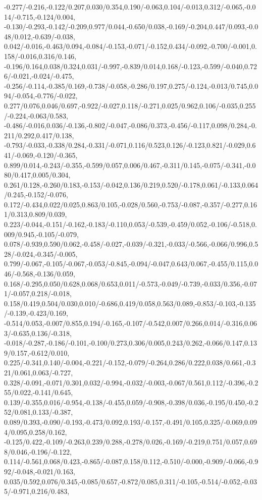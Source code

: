 {-0.277/-0.216,-0.122/0.207,0.030/0.354,0.190/-0.063,0.104/-0.013,0.312/-0.065,-0.014/-0.715,-0.124/0.004,%
-0.130/-0.293,-0.142/-0.209,0.977/0.044,-0.650/0.038,-0.169/-0.204,0.447/0.093,-0.048/0.012,-0.639/-0.038,%
0.042/-0.016,-0.463/0.094,-0.084/-0.153,-0.071/-0.152,0.434/-0.092,-0.700/-0.001,0.158/-0.016,0.316/0.146,%
-0.196/0.164,0.038/0.324,0.031/-0.997,-0.839/0.014,0.168/-0.123,-0.599/-0.040,0.726/-0.021,-0.024/-0.475,%
-0.256/-0.114,-0.385/0.169,-0.738/-0.058,-0.286/0.197,0.275/-0.124,-0.013/0.745,0.094/-0.054,-0.776/-0.022,%
0.277/0.076,0.046/0.697,-0.922/-0.027,0.118/-0.271,0.025/0.962,0.106/-0.035,0.255/-0.224,-0.063/0.583,%
-0.486/-0.016,0.036/-0.136,-0.802/-0.047,-0.086/0.373,-0.456/-0.117,0.098/0.284,-0.211/0.292,0.417/0.138,%
-0.793/-0.033,-0.338/0.284,-0.331/-0.071,0.116/0.523,0.126/-0.123,0.821/-0.029,0.641/-0.069,-0.120/-0.365,%
0.899/0.014,-0.243/-0.355,-0.599/0.057,0.006/0.467,-0.311/0.145,-0.075/-0.341,-0.080/0.417,0.005/0.304,%
0.261/0.128,-0.260/0.183,-0.153/-0.042,0.136/0.219,0.520/-0.178,0.061/-0.133,0.064/0.245,-0.152/-0.076,%
0.172/-0.434,0.022/0.025,0.863/0.105,-0.028/0.560,-0.753/-0.087,-0.357/-0.277,0.161/0.313,0.809/0.039,%
0.223/-0.044,-0.151/-0.162,-0.183/-0.110,0.053/-0.539,-0.459/0.052,-0.106/-0.518,0.009/0.945,-0.105/-0.079,%
0.078/-0.939,0.590/0.062,-0.458/-0.027,-0.039/-0.321,-0.033/-0.566,-0.066/0.996,0.528/-0.024,-0.345/-0.005,%
0.799/-0.067,-0.105/-0.067,-0.053/-0.845,-0.094/-0.047,0.643/0.067,-0.455/0.115,0.046/-0.568,-0.136/0.059,%
0.168/-0.295,0.050/0.628,0.068/0.653,0.011/-0.573,-0.049/-0.739,-0.033/0.356,-0.071/-0.057,0.218/-0.018,%
0.158/0.419,0.504/0.030,0.010/-0.686,0.419/0.058,0.563/0.089,-0.853/-0.103,-0.135/-0.139,-0.423/0.169,%
-0.514/0.053,-0.007/0.855,0.194/-0.165,-0.107/-0.542,0.007/0.266,0.014/-0.316,0.063/-0.635,0.136/-0.318,%
-0.018/-0.287,-0.186/-0.101,-0.100/0.273,0.306/0.005,0.243/0.262,-0.066/0.147,0.139/0.157,-0.612/0.010,%
0.225/-0.341,0.140/-0.004,-0.221/-0.152,-0.079/-0.264,0.286/0.222,0.038/0.661,-0.321/0.061,0.063/-0.727,%
0.328/-0.091,-0.071/0.301,0.032/-0.994,-0.032/-0.003,-0.067/0.561,0.112/-0.396,-0.255/0.022,-0.141/0.645,%
0.139/-0.355,0.016/-0.954,-0.138/-0.455,0.059/-0.908,-0.398/0.036,-0.195/0.450,-0.252/0.081,0.133/-0.387,%
0.089/0.393,-0.090/-0.193,-0.473/0.092,0.193/-0.157,-0.491/0.105,0.325/-0.069,0.094/0.095,0.258/0.162,%
-0.125/0.422,-0.109/-0.263,0.239/0.288,-0.278/0.026,-0.169/-0.219,0.751/0.057,0.698/0.046,-0.196/-0.122,%
0.114/-0.561,0.068/0.423,-0.865/-0.087,0.158/0.112,-0.510/-0.000,-0.909/-0.066,-0.992/-0.048,-0.021/0.163,%
0.035/0.592,0.076/0.345,-0.085/0.657,-0.872/0.085,0.311/-0.105,-0.514/-0.052,-0.035/-0.971,0.216/0.483,%
}
